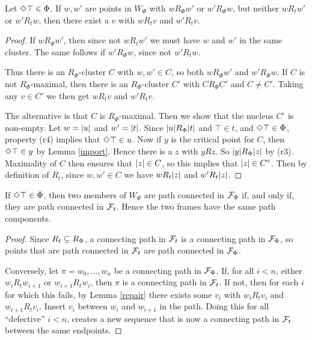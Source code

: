 \begin{lemma} \label{repair}
Let $\Diamond\top\in\Phi$. If $w,w'$ are points in $W_\Phi$ with $wR_\Phi w'$ or $w'R_\Phi w$, but neither $wR_tw'$ or $w'R_tw$, then there exist a $v$ with $wR_t v$ and $w'R_t v$.
\end{lemma}
\begin{proof}
If $wR_\Phi w'$, then since not  $wR_tw'$ we must have $w$ and $w'$ in the same cluster. The same follows if $w'R_\Phi w$, since not $w'R_tw$.

Thus there is an $R_\Phi$-cluster $C$ with $w,w'\in C$, so both $wR_\Phi w'$ and $w'R_\Phi w$. If $C$ is not $R_\Phi$-maximal, then there is an  $R_\Phi$-cluster $C'$ with $CR_\Phi C'$ and  $C\ne C'$. Taking any $v\in C'$ we then get $wR_tv$ and $w'R_tv$.

The alternative is that $C$ is  $R_\Phi$-maximal. Then we show that the nucleus $C^\circ$ is non-empty. 
Let $w=|u|$ and $w'=|t|$.
Since  $|u|R_\Phi|t|$ and $\top\in t$, and $\Diamond\top\in\Phi$, property (r4) implies that 
$\Diamond\top\in u$. Now if $y$ is the critical point for $C$, then $\Diamond\top\in y$ by Lemma \ref{import}. Hence there is a $z$ with $yRz$. So $|y|R_\Phi|z|$ by (r3).  Maximality of $C$ then ensures that  $|z|\in C$, so this implies that $|z|\in C^\circ$.  Then by definition of $R_t$, since $w,w'\in C$ we have $wR_t|z|$ and  $w'R_t|z|$. 
\end{proof}


\begin{lemma} \label{pathcon}
If $\Diamond\top\in\Phi$, then two members of $W_\Phi$ are path connected in $\mathcal{F}_\Phi$ if, and only if, they are path connected in $\mathcal{F}_t$. Hence the two frames have the same path components.
\end{lemma}
\begin{proof}
Since $R_t\subseteq R_\Phi$, a connecting path in $\mathcal{F}_t$ is a connecting path in $\mathcal{F}_\Phi$, so points that are path connected in $\mathcal{F}_t$ are path connected in $\mathcal{F}_\Phi$. 

Conversely, let $\pi=w_0,\dots,w_n$ be a connecting path in $\mathcal{F}_\Phi$. If, for all $i<n$, either $w_iR_tw_{i+1}$ or $w_{i+1}R_tw_{i}$, then $\pi$ is a connecting path in  $\mathcal{F}_t$. If not, then for each $i$ for which this fails, by Lemma \ref{repair} there exists some $v_i$ with $w_iR_t v_i$ and $w_{i+1}R_t v_i$. Insert $v_i$ between $w_i$ and $w_{i+1}$ in the path. Doing this for
all ``defective'' $i<n$, creates a new sequence that is now a connecting path in $\mathcal{F}_t$ between the same endpoints.
\end{proof}

